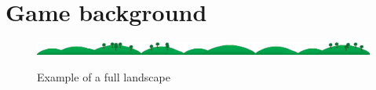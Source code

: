 \chapter{Game background}
\begin{landscape}
\begin{figure}[h]
\includegraphics[scale=0.4]{img/screenshots/landscape1.jpg}\\
\caption{Example of a full landscape}
\end{figure}
\end{landscape}

